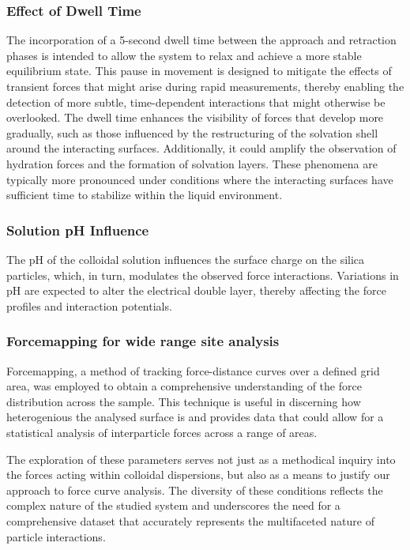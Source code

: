 \subsubsection{Effect of Dwell Time}

The incorporation of a 5-second dwell time between the approach and retraction phases is intended to allow the system to relax and achieve a more stable equilibrium state. This pause in movement is designed to mitigate the effects of transient forces that might arise during rapid measurements, thereby enabling the detection of more subtle, time-dependent interactions that might otherwise be overlooked. The dwell time enhances the visibility of forces that develop more gradually, such as those influenced by the restructuring of the solvation shell around the interacting surfaces. Additionally, it could amplify the observation of hydration forces and the formation of solvation layers. These phenomena are typically more pronounced under conditions where the interacting surfaces have sufficient time to stabilize within the liquid environment. 

\subsubsection{Solution pH Influence}

The pH of the colloidal solution influences the surface charge on the silica particles, which, in turn, modulates the observed force interactions. Variations in pH are expected to alter the electrical double layer, thereby affecting the force profiles and interaction potentials. 

\subsubsection{Forcemapping for wide range site analysis}

Forcemapping, a method of tracking force-distance curves over a defined grid area, was employed to obtain a comprehensive understanding of the force distribution across the sample. This technique is useful in discerning how heterogenious the analysed surface is and provides data that could allow for a statistical analysis of interparticle forces across a range of areas.

The exploration of these parameters serves not just as a methodical inquiry into the forces acting within colloidal dispersions, but also as a means to justify our approach to force curve analysis. The diversity of these conditions reflects the complex nature of the studied system and underscores the need for a comprehensive dataset that accurately represents the multifaceted nature of particle interactions.

